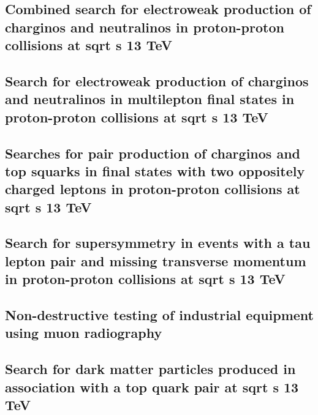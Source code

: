 \documentclass[a4paper, 11pt, twoside, openright]{report}
\begin{document}
\subsection{Combined search for electroweak production of charginos and neutralinos in proton-proton collisions at sqrt s 13 TeV}


\subsection{Search for electroweak production of charginos and neutralinos in multilepton final states in proton-proton collisions at sqrt s 13 TeV}


\subsection{Searches for pair production of charginos and top squarks in final states with two oppositely charged leptons in proton-proton collisions at sqrt s 13 TeV}


\subsection{Search for supersymmetry in events with a tau lepton pair and missing transverse momentum in proton-proton collisions at sqrt s 13 TeV}


\subsection{Non-destructive testing of industrial equipment using muon radiography}


\subsection{Search for dark matter particles produced in association with a top quark pair at sqrt s 13 TeV}

\end{document}
